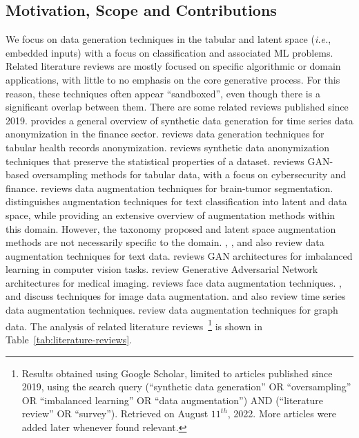 \subsection{Motivation, Scope and Contributions}

We focus on data generation techniques in the tabular and latent space
(\textit{i.e.}, embedded inputs) with a focus on classification and associated
ML problems. Related literature reviews are mostly focused on specific
algorithmic or domain applications, with little to no emphasis on the core
generative process. For this reason, these techniques often appear
``sandboxed'', even though there is a significant overlap between them. There
are some related reviews published since 2019. \cite{assefa2020generating}
provides a general overview of synthetic data generation for time series data
anonymization in the finance sector. \cite{hernandez2022synthetic} reviews
data generation techniques for tabular health records anonymization.
\cite{raghunathan2021synthetic} reviews synthetic data anonymization
techniques that preserve the statistical properties of a dataset.
\cite{sauber2022use} reviews GAN-based oversampling methods for tabular
data, with a focus on cybersecurity and finance. \cite{nalepa2019data}
reviews data augmentation techniques for brain-tumor segmentation.
\cite{bayer2021survey} distinguishes augmentation techniques for text
classification into latent and data space, while providing an extensive
overview of augmentation methods within this domain. However, the taxonomy
proposed and latent space augmentation methods are not necessarily specific to
the domain. \cite{shorten2021text}, \cite{chen2021empirical},
\cite{feng2021survey} and \cite{liu2020survey} also review data augmentation
techniques for text data. \cite{sampath2021survey} reviews GAN
architectures for imbalanced learning in computer vision tasks.
\cite{yi2019generative} review Generative Adversarial Network architectures
for medical imaging. \cite{wang2020survey} reviews face data augmentation
techniques. \cite{Shorten2019}, \cite{khosla2020enhancing} and
\cite{khalifa2021comprehensive} discuss techniques for image data
augmentation.  \cite{Iwana2021} and \cite{wen2020time} also review
time series data augmentation techniques.  \cite{zhao2022graph} review data
augmentation techniques for graph data. The analysis of related literature
reviews~\footnote{Results obtained using Google Scholar, limited to articles
    published since 2019, using the search query {\selectfont
        (``synthetic data generation'' OR ``oversampling'' OR ``imbalanced
        learning'' OR ``data augmentation'') AND (``literature review'' OR
``survey'')}. Retrieved on August $11^{th}$, 2022. More articles were added
later whenever found relevant.  } is shown in
Table~\ref{tab:literature-reviews}.

